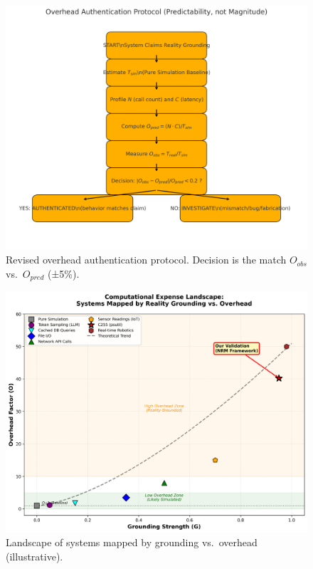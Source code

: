 \documentclass[11pt]{article}
\begin{document}
\begin{figure}[t]
\centering
\includegraphics[width=0.95\linewidth]{figure2_overhead_authentication_flowchart_v2.png}
\caption{Revised overhead authentication protocol. Decision is the match $O_{obs}$ vs.\ $O_{pred}$ (±5\%).}
\end{figure}

\begin{figure}[t]
\centering
\includegraphics[width=0.95\linewidth]{figure3_grounding_overhead_landscape.png}
\caption{Landscape of systems mapped by grounding vs.\ overhead (illustrative).}
\end{figure}
\end{document}
